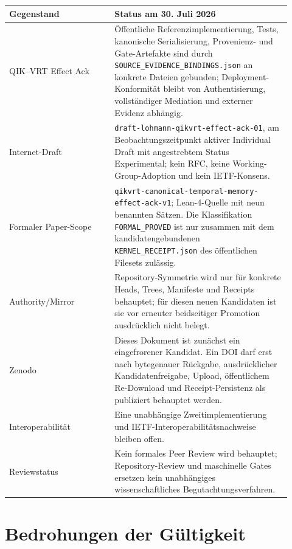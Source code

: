 \documentclass[11pt,a4paper]{article}
\theoremstyle{remark}
\begin{document}
\begin{longtable}{@{}p{0.34\linewidth}p{0.58\linewidth}@{}}
\toprule
\textbf{Gegenstand} & \textbf{Status am 30. Juli 2026} \\
\midrule
\endhead
QIK--VRT Effect Ack &
Öffentliche Referenzimplementierung, Tests, kanonische Serialisierung,
Provenienz- und Gate-Artefakte sind durch
\texttt{SOURCE\_EVIDENCE\_BINDINGS.json} an konkrete Dateien gebunden;
Deployment-Konformität bleibt von Authentisierung, vollständiger Mediation
und externer Evidenz abhängig.\\
Internet-Draft &
\texttt{draft-lohmann-qikvrt-effect-ack-01}, am Beobachtungszeitpunkt aktiver
Individual Draft mit angestrebtem Status Experimental; kein RFC, keine
Working-Group-Adoption und kein IETF-Konsens.\\
Formaler Paper-Scope &
\texttt{qikvrt-canonical-temporal-memory-effect-ack-v1}; Lean-4-Quelle mit
neun benannten Sätzen. Die Klassifikation \texttt{FORMAL\_PROVED} ist nur
zusammen mit dem kandidatengebundenen \texttt{KERNEL\_RECEIPT.json} des
öffentlichen Filesets zulässig.\\
Authority/Mirror &
Repository-Symmetrie wird nur für konkrete Heads, Trees, Manifeste und
Receipts behauptet; für diesen neuen Kandidaten ist sie vor erneuter
beidseitiger Promotion ausdrücklich nicht belegt.\\
Zenodo &
Dieses Dokument ist zunächst ein eingefrorener Kandidat. Ein DOI darf erst
nach bytegenauer Rückgabe, ausdrücklicher Kandidatenfreigabe, Upload,
öffentlichem Re-Download und Receipt-Persistenz als publiziert behauptet
werden.\\
Interoperabilität &
Eine unabhängige Zweitimplementierung und IETF-Interoperabilitätsnachweise
bleiben offen.\\
Reviewstatus &
Kein formales Peer Review wird behauptet; Repository-Review und maschinelle
Gates ersetzen kein unabhängiges wissenschaftliches Begutachtungsverfahren.\\
\bottomrule
\end{longtable}

\section{Bedrohungen der Gültigkeit}
\end{document}

